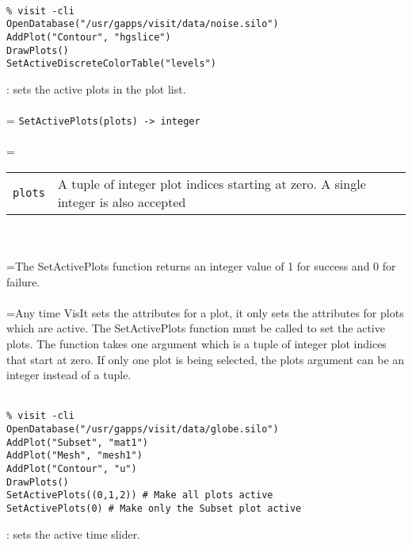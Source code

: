 \documentclass[10pt,a4paper]{report}
\begin{document}
\\[-6mm]
\begin{verbatim}% visit -cli
OpenDatabase("/usr/gapps/visit/data/noise.silo")
AddPlot("Contour", "hgslice")
DrawPlots()
SetActiveDiscreteColorTable("levels")
\end{verbatim}
\newpage


{}
: sets the active plots in the plot list.\\[-3mm]

 \\ 
\hangindent=\parindent 
\verb!SetActivePlots(plots) -> integer!\\ [-3mm]

 \\ 
\hangindent=\parindent 
\begin{tabular}{lp{9cm}}
\verb!plots! & A tuple of integer plot indices starting at zero. A single integer is also accepted \\
\end{tabular} \\[-2mm]


 \\ 
\hangindent=\parindent The SetActivePlots function returns an integer value of 1 for success and 0 for failure. \\[-3mm] 

 \\ 
\hangindent=\parindent Any time VisIt sets the attributes for a plot, it only sets the attributes for plots which are active. The SetActivePlots function must be called to set the active plots. The function takes one argument which is a tuple of integer plot indices that start at zero. If only one plot is being selected, the plots argument can be an integer instead of a tuple. \\[-3mm] 

\\[-6mm]
\begin{verbatim}% visit -cli
OpenDatabase("/usr/gapps/visit/data/globe.silo")
AddPlot("Subset", "mat1")
AddPlot("Mesh", "mesh1")
AddPlot("Contour", "u")
DrawPlots()
SetActivePlots((0,1,2)) # Make all plots active
SetActivePlots(0) # Make only the Subset plot active
\end{verbatim}
\newpage


{}
: sets the active time slider.\\[-3mm]
\end{document}
